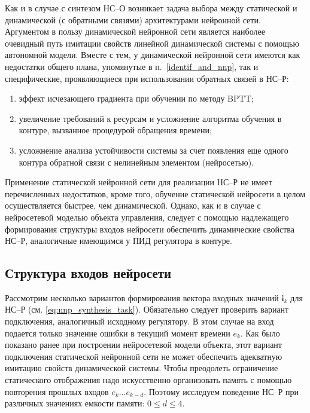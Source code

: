 Как и в случае с синтезом НС--О возникает задача выбора между
статической и динамической (с обратными связями) архитектурами
нейронной сети.  Аргументом в пользу динамической нейронной сети
является наиболее очевидный путь имитации свойств линейной
динамической системы с помощью автономной модели.  Вместе с тем, у
динамической нейронной сети имеются как недостатки общего плана,
упомянутые в п.~\ref{identif_and_nnp}, так и специфические,
проявляющиеся при использовании обратных связей в НС--Р:

\begin{enumerate}
\item эффект исчезающего градиента при обучении по методу BPTT;
\item увеличение требований к ресурсам и усложнение алгоритма обучения
      в контуре, вызванное процедурой обращения времени;
\item усложнение анализа устойчивости системы за счет появления еще
      одного контура обратной связи с нелинейным элементом (нейросетью).
\end{enumerate}

Применение статической нейронной сети для реализации НС--Р не имеет
перечисленных недостатков, кроме того, обучение статической нейросети
в целом осуществляется быстрее, чем динамической.  Однако, как и в
случае с нейросетевой моделью объекта управления, следует с помощью
надлежащего формирования структуры входов нейросети обеспечить
динамические свойства НС--Р, аналогичные имеющимся у ПИД регулятора в
контуре.

\subsection{Структура входов нейросети}\label{nnc_inputs}

Рассмотрим несколько вариантов формирования вектора входных значений
$\mathbf{i}_k$ для НС--Р (см. \eqref{eq:nnp_synthesis_task}).
Обязательно следует проверить вариант подключения, аналогичный
исходному регулятору.  В этом случае на вход подается только значение
ошибки в текущий момент времени $e_k$.  Как было показано ранее при
построении нейросетевой модели объекта, этот вариант подключения
статической нейронной сети не может обеспечить адекватную имитацию
свойств динамической системы.  Чтобы преодолеть ограничение
статического отображения надо искусственно организовать память с
помощью повторения прошлых входов $e_k\ldots e_{k-d}$.  Поэтому
исследуем поведение НС--Р при различных значениях емкости памяти:
$0\le d\le 4$.

